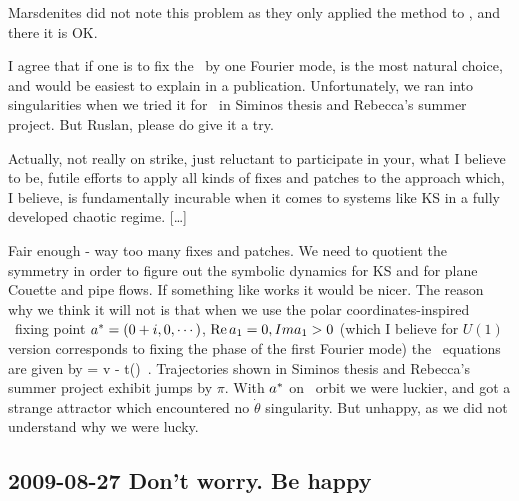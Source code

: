 Marsdenites did not note this problem as they only applied
the method to \reqva, and there it is OK.

I agree that if one is to fix the \slice\ by one Fourier
mode,  is the most natural choice, and would be
easiest to explain in a publication. Unfortunately, we ran
into singularities when we tried it for \CLe\ in Siminos
thesis and
     {Rebecca's summer project}.
But Ruslan, please do give it a try.

\medskip{}
Actually, not really on strike, just reluctant to participate
in your, what I believe to be, futile efforts to apply all
kinds of fixes and patches to the approach which, I believe,
is fundamentally incurable when it comes to systems like KS
in a fully developed chaotic regime. [\dots]

\medskip{} Fair enough - way too many fixes and
patches. We need to quotient the symmetry in order to figure
out the symbolic dynamics for KS and for plane Couette and
pipe flows. If something like  works it would
be nicer. The reason why we think it will not is that when we
use the polar coordinates-inspired \slice\ fixing point
$a^{*}=(0+i,0, \cdots)$, ${\rm Re}\,a_1=0,\;\\Ima_1>0$
(which I believe for $U(1)$ version corresponds to fixing the
phase of the first Fourier mode) the \reducedsp\ equations
are given by
\beq
\dot{\ssp} = v -  t(\ssp)
\,.
Trajectories shown in %
Siminos thesis and
     {Rebecca's summer project}
exhibit jumps by $\pi$. With $a^{*}$ on \reqv\ orbit we
were luckier, and got a strange attractor which encountered
no $\dot{\theta}$ singularity. But unhappy, as we did not
understand why we were lucky.

\subsection{2009-08-27 Don't worry. Be happy}

